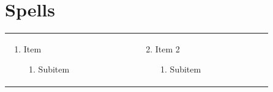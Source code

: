 \section{Spells}
\renewcommand{\labelenumii}{\arabic{enumii}.}
\begin{tabular}{@{} p{0.25\linewidth} p{0.25\linewidth}}
\begin{enumerate}
	\item Item
	\begin{enumerate}
		\item Subitem
	\end{enumerate}
\end{enumerate} &
\begin{enumerate}
	\setcounter{enumi}{1}
	\item Item 2
	\begin{enumerate}
		\item Subitem
	\end{enumerate}
\end{enumerate} 
\end{tabular}
\pagebreak

\section{}

